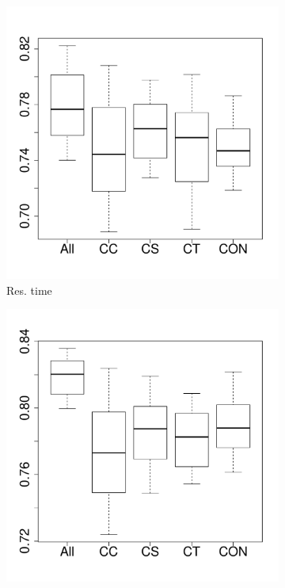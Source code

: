 \documentclass[10pt,journal,compsoc]{IEEEtran}
\begin{document}
\begin{figure}[t]
	\centering
        \begin{subfigure}{0.19\textwidth}
                \includegraphics[width=\linewidth]{Figures/runtime-cassandraremove-importance.pdf}
                \caption{Res. time}
        \end{subfigure}%
        \begin{subfigure}{0.19\textwidth}
                \includegraphics[width=\linewidth]{Figures/cpu-cassandraremove-importance.pdf}

\end{subfigure}
\end{figure}
\end{document}
